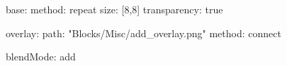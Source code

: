 base:
  method: repeat
  size: [8,8]
  transparency: true

overlay:
  path: "Blocks/Misc/add_overlay.png"
  method: connect

blendMode: add